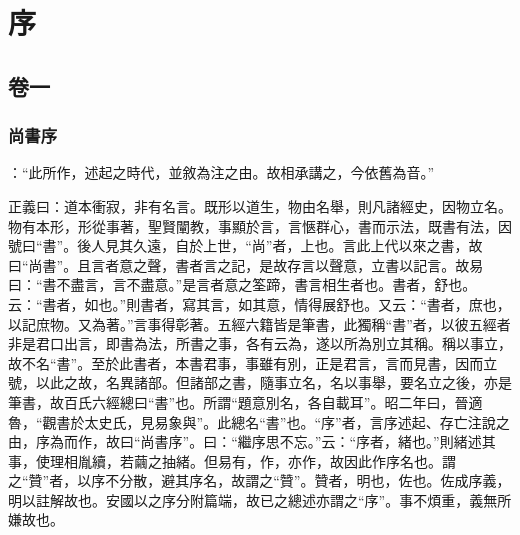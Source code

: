 

\part{序}


\chapter{卷一}

\section{尚書序}

 {\noindent \zhu{}\fzbyks {}：“此所作，述起之時代，並敘為注之由。故相承講之，今依舊為音。”\par}

 {\noindent \shu{}\fzkt 正義曰：道本衝寂，非有名言。既形以道生，物由名舉，則凡諸經史，因物立名。物有本形，形從事著，聖賢闡教，事顯於言，言愜群心，書而示法，既書有法，因號曰“書”。後人見其久遠，自於上世，“尚”者，上也。言此上代以來之書，故曰“尚書”。且言者意之聲，書者言之記，是故存言以聲意，立書以記言。故易曰：“書不盡言，言不盡意。”是言者意之筌蹄，書言相生者也。書者，舒也。云：“書者，如也。”則書者，寫其言，如其意，情得展舒也。又云：“書者，庶也，以記庶物。又為著。”言事得彰著。五經六籍皆是筆書，此獨稱“書”者，以彼五經者非是君口出言，即書為法，所書之事，各有云為，遂以所為別立其稱。稱以事立，故不名“書”。至於此書者，本書君事，事雖有別，正是君言，言而見書，因而立號，以此之故，名異諸部。但諸部之書，隨事立名，名以事舉，要名立之後，亦是筆書，故百氏六經總曰“書”也。所謂“題意別名，各自載耳”。昭二年曰，晉適魯，“觀書於太史氏，見易象與”。此總名“書”也。“序”者，言序述起、存亡注說之由，序為而作，故曰“尚書序”。曰：“繼序思不忘。”云：“序者，緒也。”則緒述其事，使理相胤續，若繭之抽緒。但易有，作，亦作，故因此作序名也。謂之“贊”者，以序不分散，避其序名，故謂之“贊”。贊者，明也，佐也。佐成序義，明以註解故也。安國以之序分附篇端，故已之總述亦謂之“序”。事不煩重，義無所嫌故也。\par}

